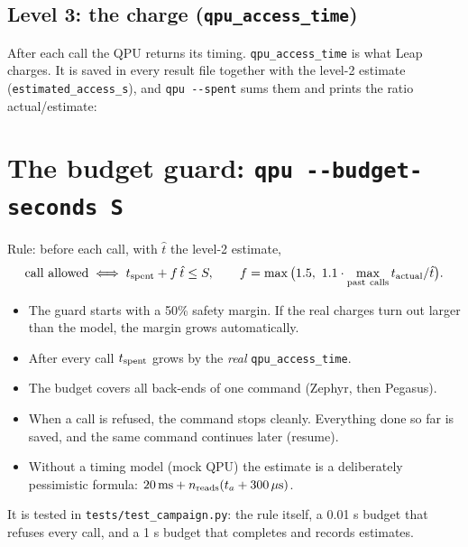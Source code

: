\documentclass[11pt,a4paper]{article}
\newcommand{\code}[1]{\nolinkurl{#1}}
\newcommand{\src}[4]{}
\begin{document}
\subsection{Level 3: the charge (\texorpdfstring{\code{qpu_access_time}}{qpu access time})}
After each call the QPU returns its timing. \code{qpu_access_time} is what Leap charges. It is saved in every result
file together with the level-2 estimate (\code{estimated_access_s}), and \code{qpu --spent} sums them and prints the ratio
actual/estimate:
\src{main_simulation.py}{\rSpentA}{\rSpentB}{\code{qpu --spent}: what was actually charged}

\section{The budget guard: \texorpdfstring{\code{qpu --budget-seconds S}}{qpu --budget-seconds S}}
\src{main_simulation.py}{\rBudgetA}{\rBudgetB}{budget object and per-call estimate}
\src{main_simulation.py}{\rAnnealA}{\rAnnealB}{the anneal stage: guard before every call, real charge after it}
Rule: before each call, with $\hat t$ the level-2 estimate,
\begin{equation}
\text{call allowed}\iff t_{\rm spent}+f\,\hat t\le S,\qquad f=\max\big(1.5,\ 1.1\cdot\max_{\rm past\ calls}t_{\rm actual}/\hat t\big).
\end{equation}
\begin{itemize}
\item The guard starts with a 50\% safety margin. If the real charges turn out larger than the model, the margin grows automatically.
\item After every call $t_{\rm spent}$ grows by the \emph{real} \code{qpu_access_time}.
\item The budget covers all back-ends of one command (Zephyr, then Pegasus).
\item When a call is refused, the command stops cleanly. Everything done so far is saved, and the same command continues later (resume).
\item Without a timing model (mock QPU) the estimate is a deliberately pessimistic formula: $20\,{\rm ms}+n_{\rm reads}(t_a+300\,\mu{\rm s})$.
\end{itemize}
It is tested in \code{tests/test_campaign.py}: the rule itself, a 0.01 s budget that refuses every call, and a 1 s budget that completes and records estimates.
\end{document}
